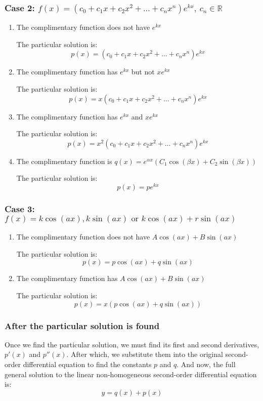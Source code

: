 \documentclass[11pt]{article}
\begin{document}
\subsubsection{Case 2: \(f(x) = (c_0 + c_1 x + c_2 x^2 + \ldots + c_n x^n) e^{kx}, \  c_n \in \mathbb{R}\)}
\label{sec:org5a41c3e}

\begin{enumerate}
\item The complimentary function does not have \(e^{kx}\)
\label{sec:orgd23b9e9}

The particular solution is:
\[p(x) = (c_0 + c_1 x + c_2 x^2 + \ldots + c_n x^n) e^{kx}\]

\item The complimentary function has \(e^{kx}\) but not \(xe^{kx}\)
\label{sec:org3767637}

The particular solution is:
\[p(x) = x(c_0 + c_1 x + c_2 x^2 + \ldots + c_n x^n) e^{kx}\]

\item The complimentary function has \(e^{kx}\) and \(xe^{kx}\)
\label{sec:org9e639d9}

The particular solution is:
\[p(x) = x^2(c_0 + c_1 x + c_2 x^2 + \ldots + c_n x^n) e^{kx}\]

\item The complimentary function is \(q(x) = e^{\alpha x} (C_1 \cos (\beta x) + C_2 \sin (\beta x))\)
\label{sec:org9574264}

The particular solution is:
\[p(x) = pe^{kx}\]
\end{enumerate}

\subsubsection{Case 3: \(f(x) = k \cos (ax), k \sin (ax) \text{ or } k \cos (ax) + r \sin (ax)\)}
\label{sec:org85ab874}

\begin{enumerate}
\item The complimentary function does not have \(A \cos (ax) + B \sin (ax)\)
\label{sec:orgb14ac41}

The particular solution is:
\[p(x) = p \cos (ax) + q \sin (ax)\]

\item The complimentary function has \(A \cos (ax) + B \sin (ax)\)
\label{sec:orgafc7a1d}

The particular solution is:
\[p(x) = x(p \cos (ax) + q \sin (ax))\]
\end{enumerate}

\subsubsection{After the particular solution is found}
\label{sec:org96c6af9}
Once we find the particular solution, we must find its first and second derivatives, \(p'(x)\) and \(p''(x)\). After which, we substitute them into the original second-order differential equation to find the constants \(p\) and \(q\). And now, the full general solution to the linear non-homogeneous second-order differential equation is:
\[y = q(x) + p(x)\]
\end{document}
